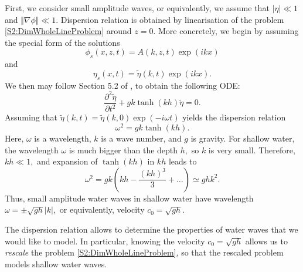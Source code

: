 First, we consider small amplitude waves, or equivalently, we assume that $|\eta| \ll 1$ and $\Vert \nabla \phi \Vert \ll 1.$ Dispersion relation is obtained by linearisation of the problem \eqref{S2:DimWholeLineProblem} around $z=0.$ More concretely, we begin by assuming the special form of the solutions
\[
\phi_s(x,z,t) = A(k,z,t) \exp(ikx) 
\]
and 
\[ 
\eta_s(x,t) = \tilde{\eta}(k,t)\exp(ikx).
\]
We then may follow Section 5.2 of \cite{Ablowitz}, to obtain the following ODE:
\[ 
\frac{\partial^2 \tilde{\eta}}{\partial t^2} + g k \tanh(k h) \tilde{\eta} = 0.
\]
Assuming that $ \tilde{\eta}(k,t) = \tilde{\eta}(k, 0) \exp(-i \omega t)$ yields the dispersion relation
\[ 
\omega^2 = g k \tanh(k h).
\]
Here, $\omega$ is a wavelength, $k$ is a wave number, and $g$ is gravity. For shallow water, the wavelength $\omega$ is much bigger than the depth $h,$ so $k$ is very small. Therefore, $kh \ll 1,$ and expansion of $\tanh(kh)$ in $kh$ leads to
\[ \omega^2 = gk(kh - \frac{(kh)^3}{3} + \ldots)  \simeq ghk^2. \]
Thus, small amplitude water waves in shallow water have wavelength $ \omega = \pm \sqrt{gh}|k|,$ or equivalently, velocity $c_0 = \sqrt{gh}.$ 

The dispersion relation allows to determine the properties of water waves that we would like to model. In particular, knowing the velocity $c_0 = \sqrt{gh}$ allows us to \textit{rescale} the problem \eqref{S2:DimWholeLineProblem}, so that the rescaled problem models shallow water waves.

